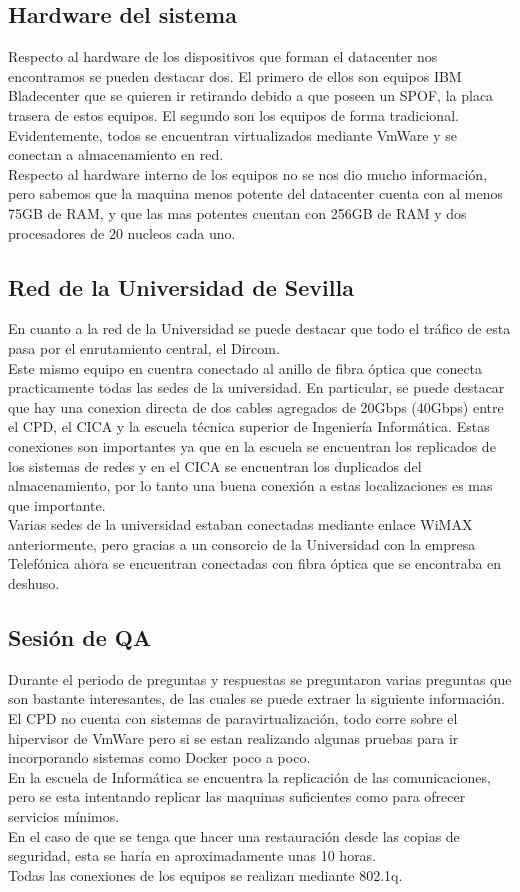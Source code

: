 \documentclass[a4paper,11pt]{article}
\begin{document}
\subsection{Hardware del sistema}
Respecto al hardware de los dispositivos que forman el datacenter nos encontramos se pueden destacar dos.
El primero de ellos son equipos IBM Bladecenter que se quieren ir retirando debido a que poseen un SPOF, la placa trasera de estos equipos.
El segundo son los equipos de forma tradicional. Evidentemente, todos se encuentran virtualizados mediante VmWare y se conectan a almacenamiento en red.\\
Respecto al hardware interno de los equipos no se nos dio mucho información, pero sabemos que la maquina menos potente del datacenter cuenta con al menos 75GB de RAM, y que las mas potentes cuentan con 256GB de RAM y dos procesadores de 20 nucleos cada uno.

\subsection{Red de la Universidad de Sevilla}\label{sec:red}
En cuanto a la red de la Universidad se puede destacar que todo el tráfico de esta pasa por el enrutamiento central, el Dircom.\\
Este mismo equipo en cuentra conectado al anillo de fibra óptica que conecta practicamente todas las sedes de la universidad. En particular, se puede destacar que hay una conexion directa de dos cables agregados de 20Gbps (40Gbps) entre el CPD, el CICA y la escuela técnica superior de Ingeniería Informática. Estas conexiones son importantes ya que en la escuela se encuentran los replicados de los sistemas de redes y en el CICA se encuentran los duplicados del almacenamiento, por lo tanto una buena conexión a estas localizaciones es mas que importante.\\
Varias sedes de la universidad estaban conectadas mediante enlace WiMAX anteriormente, pero gracias a un consorcio de la Universidad con la empresa Telefónica ahora se encuentran conectadas con fibra óptica que se encontraba en deshuso.\\

\subsection{Sesión de QA}
Durante el periodo de preguntas y respuestas se preguntaron varias preguntas que son bastante interesantes, de las cuales se puede extraer la siguiente información.\\
El CPD no cuenta con sistemas de paravirtualización, todo corre sobre el hipervisor de VmWare pero si se estan realizando algunas pruebas para ir incorporando sistemas como Docker poco a poco.\\
En la escuela de Informática se encuentra la replicación de las comunicaciones, pero se esta intentando replicar las maquinas suficientes como para ofrecer servicios mínimos.\\
En el caso de que se tenga que hacer una restauración desde las copias de seguridad, esta se haría en aproximadamente unas 10 horas.\\
Todas las conexiones de los equipos se realizan mediante 802.1q.
\end{document}
